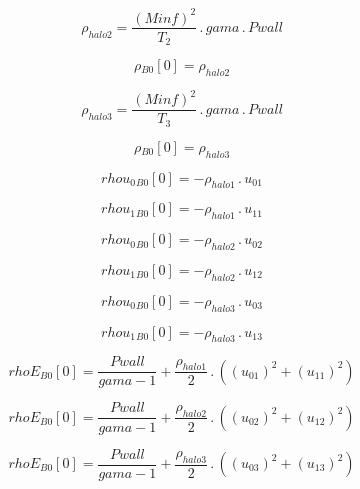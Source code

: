 \documentclass{article}
\begin{document}
\begin{dmath}\rho_{halo 2} = \frac{\left(Minf \right)^{2}}{T_{2}} \,.\, gama \,.\, Pwall\end{dmath}

\begin{dmath}{\rho{_{B0}}}[{0}] = \rho_{halo 2}\end{dmath}

\begin{dmath}\rho_{halo 3} = \frac{\left(Minf \right)^{2}}{T_{3}} \,.\, gama \,.\, Pwall\end{dmath}

\begin{dmath}{\rho{_{B0}}}[{0}] = \rho_{halo 3}\end{dmath}

\begin{dmath}{rhou_{0}{_{B0}}}[{0}] = - \rho_{halo 1} \,.\, u_{01}\end{dmath}

\begin{dmath}{rhou_{1}{_{B0}}}[{0}] = - \rho_{halo 1} \,.\, u_{11}\end{dmath}

\begin{dmath}{rhou_{0}{_{B0}}}[{0}] = - \rho_{halo 2} \,.\, u_{02}\end{dmath}

\begin{dmath}{rhou_{1}{_{B0}}}[{0}] = - \rho_{halo 2} \,.\, u_{12}\end{dmath}

\begin{dmath}{rhou_{0}{_{B0}}}[{0}] = - \rho_{halo 3} \,.\, u_{03}\end{dmath}

\begin{dmath}{rhou_{1}{_{B0}}}[{0}] = - \rho_{halo 3} \,.\, u_{13}\end{dmath}

\begin{dmath}{rhoE{_{B0}}}[{0}] = \frac{Pwall}{gama - 1} + \frac{\rho_{halo 1}}{2} \,.\, \left(\left(u_{01} \right)^{2} + \left(u_{11} \right)^{2}\right)\end{dmath}

\begin{dmath}{rhoE{_{B0}}}[{0}] = \frac{Pwall}{gama - 1} + \frac{\rho_{halo 2}}{2} \,.\, \left(\left(u_{02} \right)^{2} + \left(u_{12} \right)^{2}\right)\end{dmath}

\begin{dmath}{rhoE{_{B0}}}[{0}] = \frac{Pwall}{gama - 1} + \frac{\rho_{halo 3}}{2} \,.\, \left(\left(u_{03} \right)^{2} + \left(u_{13} \right)^{2}\right)\end{dmath}
\end{document}

